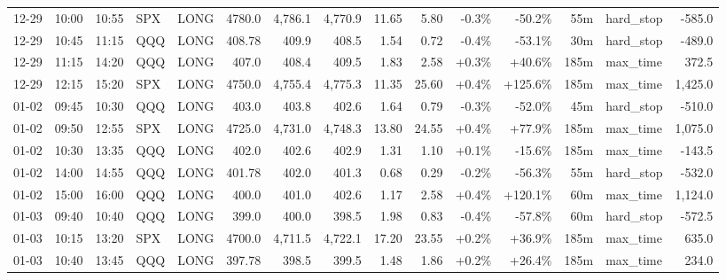 \documentclass[11pt,a4paper,twoside]{article}
\begin{document}
\begin{landscape}
\begin{center}
\begin{longtable}{>{\color{txtmain}}l l l l l r r r r r r r r >{\color{txtmain}}l r}
12-29 & 10:00 & 10:55 & SPX & LONG & 4780.0 & 4,786.1 & 4,770.9 & 11.65 & 5.80 & \textcolor{lossred}{-0.3\%} & \textcolor{lossred}{-50.2\%} & 55m & hard\_stop & \textcolor{lossred}{-585.0} \\
12-29 & 10:45 & 11:15 & QQQ & LONG & 408.78 & 409.9 & 408.5 & 1.54 & 0.72 & \textcolor{lossred}{-0.4\%} & \textcolor{lossred}{-53.1\%} & 30m & hard\_stop & \textcolor{lossred}{-489.0} \\
12-29 & 11:15 & 14:20 & QQQ & LONG & 407.0 & 408.4 & 409.5 & 1.83 & 2.58 & \textcolor{wingreen}{+0.3\%} & \textcolor{wingreen}{+40.6\%} & 185m & max\_time & \textcolor{wingreen}{372.5} \\
12-29 & 12:15 & 15:20 & SPX & LONG & 4750.0 & 4,755.4 & 4,775.3 & 11.35 & 25.60 & \textcolor{wingreen}{+0.4\%} & \textcolor{wingreen}{+125.6\%} & 185m & max\_time & \textcolor{wingreen}{1,425.0} \\
01-02 & 09:45 & 10:30 & QQQ & LONG & 403.0 & 403.8 & 402.6 & 1.64 & 0.79 & \textcolor{lossred}{-0.3\%} & \textcolor{lossred}{-52.0\%} & 45m & hard\_stop & \textcolor{lossred}{-510.0} \\
01-02 & 09:50 & 12:55 & SPX & LONG & 4725.0 & 4,731.0 & 4,748.3 & 13.80 & 24.55 & \textcolor{wingreen}{+0.4\%} & \textcolor{wingreen}{+77.9\%} & 185m & max\_time & \textcolor{wingreen}{1,075.0} \\
01-02 & 10:30 & 13:35 & QQQ & LONG & 402.0 & 402.6 & 402.9 & 1.31 & 1.10 & \textcolor{wingreen}{+0.1\%} & \textcolor{lossred}{-15.6\%} & 185m & max\_time & \textcolor{lossred}{-143.5} \\
01-02 & 14:00 & 14:55 & QQQ & LONG & 401.78 & 402.0 & 401.3 & 0.68 & 0.29 & \textcolor{lossred}{-0.2\%} & \textcolor{lossred}{-56.3\%} & 55m & hard\_stop & \textcolor{lossred}{-532.0} \\
01-02 & 15:00 & 16:00 & QQQ & LONG & 400.0 & 401.0 & 402.6 & 1.17 & 2.58 & \textcolor{wingreen}{+0.4\%} & \textcolor{wingreen}{+120.1\%} & 60m & max\_time & \textcolor{wingreen}{1,124.0} \\
01-03 & 09:40 & 10:40 & QQQ & LONG & 399.0 & 400.0 & 398.5 & 1.98 & 0.83 & \textcolor{lossred}{-0.4\%} & \textcolor{lossred}{-57.8\%} & 60m & hard\_stop & \textcolor{lossred}{-572.5} \\
01-03 & 10:15 & 13:20 & SPX & LONG & 4700.0 & 4,711.5 & 4,722.1 & 17.20 & 23.55 & \textcolor{wingreen}{+0.2\%} & \textcolor{wingreen}{+36.9\%} & 185m & max\_time & \textcolor{wingreen}{635.0} \\
01-03 & 10:40 & 13:45 & QQQ & LONG & 397.78 & 398.5 & 399.5 & 1.48 & 1.86 & \textcolor{wingreen}{+0.2\%} & \textcolor{wingreen}{+26.4\%} & 185m & max\_time & \textcolor{wingreen}{234.0} \\

\end{longtable}
\end{center}
\end{landscape}
\end{document}
